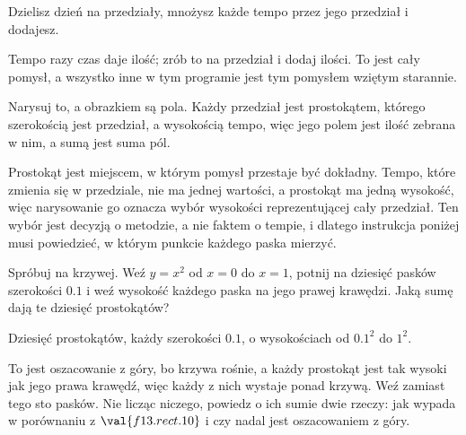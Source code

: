 \begin{fr}
\begin{ansblock}
Dzielisz dzień na przedziały, mnożysz każde tempo przez jego przedział i
dodajesz.
\end{ansblock}

Tempo razy czas daje ilość; zrób to na przedział i dodaj ilości. To jest cały
pomysł, a wszystko inne w tym programie jest tym pomysłem wziętym starannie.

Narysuj to, a obrazkiem są pola. Każdy przedział jest prostokątem, którego
szerokością jest przedział, a wysokością tempo, więc jego polem jest ilość
zebrana w nim, a sumą jest suma pól.

Prostokąt jest miejscem, w którym pomysł przestaje być dokładny. Tempo, które
zmienia się w przedziale, nie ma jednej wartości, a prostokąt ma jedną
wysokość, więc narysowanie go oznacza wybór wysokości reprezentującej cały
przedział. Ten wybór jest decyzją o metodzie, a nie faktem o tempie, i dlatego
instrukcja poniżej musi powiedzieć, w którym punkcie każdego paska mierzyć.

Spróbuj na krzywej. Weź $y = x^{2}$ od $x = 0$ do $x = 1$, potnij na dziesięć
pasków szerokości $\num{0.1}$ i weź wysokość każdego paska na jego prawej
krawędzi. Jaką sumę dają te dziesięć prostokątów?
\dotline
\nextframe
\end{fr}

\begin{fr}
Dziesięć prostokątów, każdy szerokości $\num{0.1}$, o wysokościach od
$\num{0.1}^{2}$ do $1^{2}$.

To jest oszacowanie z góry, bo krzywa rośnie, a każdy prostokąt jest tak
wysoki jak jego prawa krawędź, więc każdy z nich wystaje ponad krzywą. Weź
zamiast tego sto pasków. Nie licząc niczego, powiedz o ich sumie dwie rzeczy:
jak wypada w porównaniu z $\val{f13.rect.10}$ i czy nadal jest oszacowaniem z
góry.
\nextframe
\end{fr}

